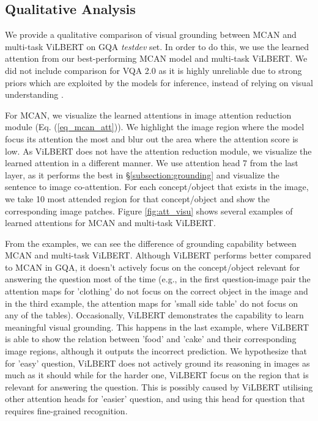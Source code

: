 \documentclass{article}
\begin{document}
\subsection{Qualitative Analysis}
We provide a qualitative comparison of visual grounding between MCAN and multi-task ViLBERT on GQA \textit{testdev} set. In order to do this, we use the learned attention from our best-performing MCAN model and multi-task ViLBERT. We did not include comparison for VQA 2.0 as it is highly unreliable due to strong priors which are exploited by the models for inference, instead of relying on visual understanding \citep{yinyang, agrawal12018gvqa}. 

For MCAN, we visualize the learned attentions in image attention reduction module (Eq. (\ref{eq_mcan_att})). We highlight the image region where the model focus its attention the most and blur out the area where the attention score is low. As ViLBERT does not have the attention reduction module, we visualize the learned attention in a different manner. We use attention head 7 from the last layer, as it performs the best in \S \ref{subsection:grounding} and visualize the sentence to image co-attention. For each concept/object that exists in the image, we take 10 most attended region for that concept/object and show the corresponding image patches. Figure \ref{fig:att_visu} shows several examples of learned attentions for MCAN and multi-task ViLBERT.

From the examples, we can see the difference of grounding capability between MCAN and multi-task ViLBERT. Although ViLBERT performs better compared to MCAN in GQA, it doesn't actively focus on the concept/object relevant for answering the question most of the time (e.g., in the first question-image pair the attention maps for 'clothing' do not focus on the correct object in the image and in the third example, the attention maps for 'small side table' do not focus on any of the tables). Occasionally, ViLBERT demonstrates the capability to learn meaningful visual grounding. This happens in the last example, where ViLBERT is able to show the relation between 'food' and 'cake' and their corresponding image regions, although it outputs the incorrect prediction. We hypothesize that for 'easy' question, ViLBERT does not actively ground its reasoning in images as much as it should while for the harder one, ViLBERT focus on the region that is relevant for answering the question. This is possibly caused by ViLBERT utilising other attention heads for 'easier' question, and using this head for question that requires fine-grained recognition.
\end{document}

